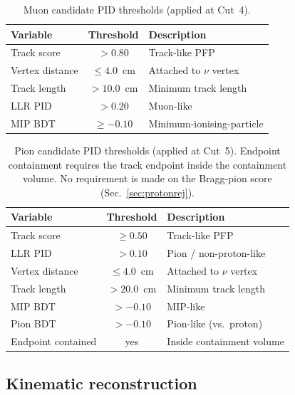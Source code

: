 \documentclass[11pt,a4paper]{article}
\begin{document}
\begin{table}[H]
  \centering
  \caption{Muon candidate PID thresholds (applied at Cut~4).}
  \label{tab:mupid}
  \begin{tabular}{lcl}
    \toprule
    Variable & Threshold & Description \\
    \midrule
    Track score                  & $> 0.80$      & Track-like PFP \\
    Vertex distance              & $\leq 4.0$~cm & Attached to $\nu$ vertex \\
    Track length                 & $> 10.0$~cm   & Minimum track length \\
    LLR PID                      & $> 0.20$      & Muon-like \\
    MIP BDT                      & $\geq -0.10$  & Minimum-ionising-particle \\
    \bottomrule
  \end{tabular}
\end{table}

\begin{table}[H]
  \centering
  \caption{Pion candidate PID thresholds (applied at Cut~5).
    Endpoint containment requires the track endpoint inside the containment
    volume. No requirement is made on the Bragg-pion score
    (Sec.~\ref{sec:protonrej}).}
  \label{tab:pipid}
  \begin{tabular}{lcl}
    \toprule
    Variable & Threshold & Description \\
    \midrule
    Track score                  & $\geq 0.50$   & Track-like PFP \\
    LLR PID                      & $> 0.10$      & Pion / non-proton-like \\
    Vertex distance              & $\leq 4.0$~cm & Attached to $\nu$ vertex \\
    Track length                 & $> 20.0$~cm   & Minimum track length \\
    MIP BDT                      & $> -0.10$     & MIP-like \\
    Pion BDT                     & $> -0.10$     & Pion-like (vs.\ proton) \\
    Endpoint contained           & yes           & Inside containment volume \\
    \bottomrule
  \end{tabular}
\end{table}

\subsection{Kinematic reconstruction}
\end{document}
